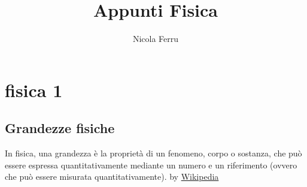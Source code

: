 \documentclass{book}
\title{Appunti Fisica}
\author{Nicola Ferru}
\date{}
\begin{document}
\maketitle
\tableofcontents


\part{fisica 1}
\chapter{Grandezze fisiche}
In fisica, una grandezza è la proprietà di un fenomeno, corpo o sostanza, che può essere espressa quantitativamente mediante un numero e un riferimento (ovvero che può essere misurata quantitativamente). by \href{https://it.wikipedia.org/wiki/Grandezza_fisica}{Wikipedia}\\
\begin{table}
	
\end{table}
\end{document}
